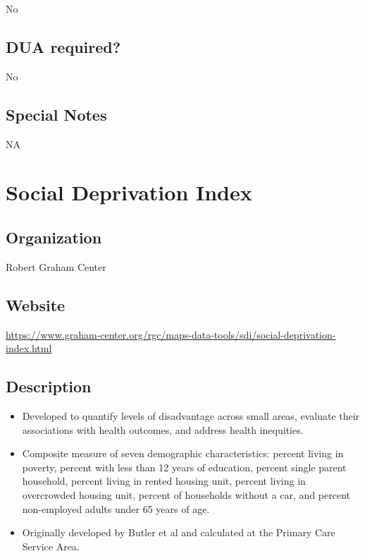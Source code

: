 \documentclass[
]{book}
\providecommand{\tightlist}{%
  \setlength{\itemsep}{0pt}\setlength{\parskip}{0pt}}
\begin{document}
No

\hypertarget{dua-required-78}{%
\section{DUA required?}\label{dua-required-78}}

No

\hypertarget{special-notes-78}{%
\section{Special Notes}\label{special-notes-78}}

NA

\mainmatter

\hypertarget{social-deprivation-index}{%
\chapter{Social Deprivation Index}\label{social-deprivation-index}}

\hypertarget{organization-79}{%
\section{Organization}\label{organization-79}}

Robert Graham Center

\hypertarget{website-79}{%
\section{Website}\label{website-79}}

\url{https://www.graham-center.org/rgc/maps-data-tools/sdi/social-deprivation-index.html}

\hypertarget{description-79}{%
\section{Description}\label{description-79}}

\begin{itemize}
\tightlist
\item
  Developed to quantify levels of disadvantage across small areas, evaluate their associations with health outcomes, and address health inequities.
\item
  Composite measure of seven demographic characteristics: percent living in poverty, percent with less than 12 years of education, percent single parent household, percent living in rented housing unit, percent living in overcrowded housing unit, percent of households without a car, and percent non-employed adults under 65 years of age.
\item
  Originally developed by Butler et al and calculated at the Primary Care Service Area.
\end{itemize}
\end{document}

